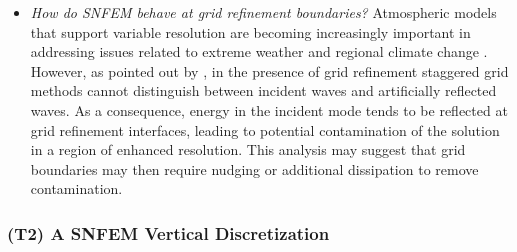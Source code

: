 \documentclass[11pt]{article}
\begin{document}
\begin{itemize}
\item \textit{How do SNFEM behave at grid refinement boundaries?}  Atmospheric models that support variable resolution are becoming increasingly important in addressing issues related to extreme weather and regional climate change \citep{skamarock2012mpas}.  However, as pointed out by \cite{ullrich2011analysis}, in the presence of grid refinement staggered grid methods cannot distinguish between incident waves and artificially reflected waves.  As a consequence, energy in the incident mode tends to be reflected at grid refinement interfaces, leading to potential contamination of the solution in a region of enhanced resolution.  This analysis may suggest that grid boundaries may then require nudging or additional dissipation to remove contamination.
\end{itemize}

\subsubsection{(T2) A SNFEM Vertical Discretization} \label{sec:VerticalSNFEM}

\end{document}
